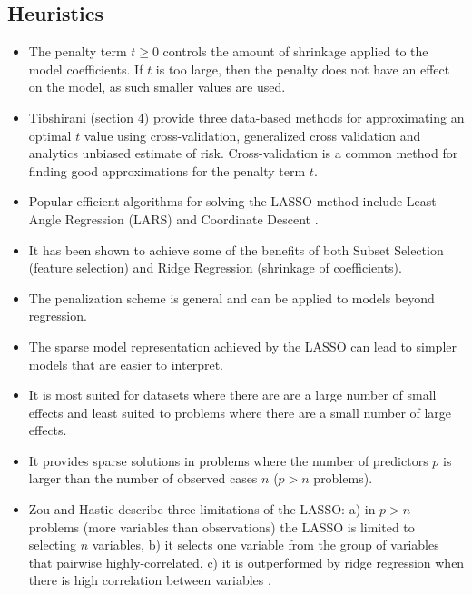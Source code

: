 \subsection{Heuristics}

\begin{itemize}
	\item The penalty term $t \geq 0$ controls the amount of shrinkage applied to the model coefficients. If $t$ is too large, then the penalty does not have an effect on the model, as such smaller values are used.
	\item Tibshirani \cite{Tibshirani1996} (section 4) provide three data-based methods for approximating an optimal $t$ value using cross-validation, generalized cross validation and analytics unbiased estimate of risk. Cross-validation is a common method for finding good approximations for the penalty term $t$.
	\item Popular efficient algorithms for solving the LASSO method include Least Angle Regression (LARS) \cite{Efron2002} and Coordinate Descent \cite{Friedman2007}.
	\item It has been shown to achieve some of the benefits of both Subset Selection (feature selection) and Ridge Regression (shrinkage of coefficients).
	\item The penalization scheme is general and can be applied to models beyond regression.
	\item The sparse model representation achieved by the LASSO can lead to simpler models that are easier to interpret. 
	\item It is most suited for datasets where there are are a large number of small effects and least suited to problems where there are a small number of large effects.
	\item It provides sparse solutions in problems where the number of predictors $p$ is larger than the number of observed cases $n$ ($p>n$ problems).
	\item Zou and Hastie describe three limitations of the LASSO: a) in $p>n$ problems (more variables than observations) the LASSO is limited to selecting $n$ variables, b) it selects one variable from the group of variables that pairwise highly-correlated, c) it is outperformed by ridge regression when there is high correlation between variables \cite{Zou2005}.
\end{itemize}

